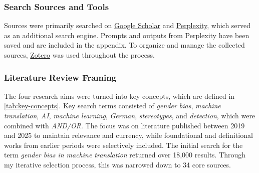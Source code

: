         \subsubsection{Search Sources and Tools}
        Sources were primarily searched on \href{https://scholar.google.com/}{Google Scholar} and \href{https://www.perplexity.ai/}{Perplexity}, which served as an additional search engine. Prompts and outputs from Perplexity have been saved and are included in the appendix. To organize and manage the collected sources, \href{https://www.zotero.org/}{Zotero} was used throughout the process.

        \subsubsection{Literature Review Framing}
        The four research aims were turned into key concepts, which are defined in \autoref{tab:key-concepts}. Key search terms consisted of \textit{gender bias}, \textit{machine translation}, \textit{AI}, \textit{machine learning}, \textit{German}, \textit{stereotypes}, and \textit{detection}, which were combined with \textit{AND/OR}. The focus was on literature published between 2019 and 2025 to maintain relevance and currency, while foundational and definitional works from earlier periods were selectively included. The initial search for the term \textit{gender bias in machine translation} returned over 18,000 results. Through my iterative selection process, this was narrowed down to 34 core sources.

